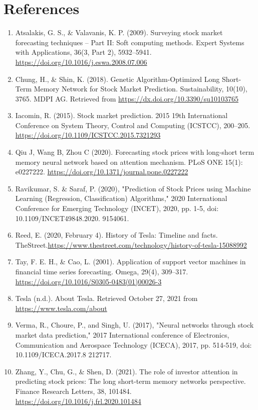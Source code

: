 \documentclass[12pt,a4paper]{article}
\begin{document}
\section*{References}
\begin{enumerate}
    \item Atsalakis, G. S., \& Valavanis, K. P. (2009). Surveying stock market forecasting techniques – Part II: Soft computing methods. Expert Systems with Applications, 36(3, Part 2), 5932–5941. \url{https://doi.org/10.1016/j.eswa.2008.07.006}
    \item Chung, H., \& Shin, K. (2018). Genetic Algorithm-Optimized Long Short-Term Memory Network for Stock Market Prediction. Sustainability, 10(10), 3765. MDPI AG. Retrieved from \url{https://dx.doi.org/10.3390/su10103765 }
    \item Iacomin, R. (2015). Stock market prediction. 2015 19th International Conference on System Theory, Control and Computing (ICSTCC), 200–205. \url{https://doi.org/10.1109/ICSTCC.2015.7321293}
    \item Qiu J, Wang B, Zhou C (2020). Forecasting stock prices with long-short term memory neural network based on attention mechanism. PLoS ONE 15(1): e0227222.  \url{https://doi.org/10.1371/journal.pone.0227222}
    \item Ravikumar, S. \& Saraf, P. (2020), "Prediction of Stock Prices using Machine Learning (Regression, Classification) Algorithms," 2020 International Conference for Emerging Technology (INCET), 2020, pp. 1-5, doi: 10.1109/INCET49848.2020.
    9154061.
    \item Reed, E. (2020, February 4). History of Tesla: Timeline and facts. TheStreet.\url{https://www.thestreet.com/technology/history-of-tesla-15088992}
    \item Tay, F. E. H., \& Cao, L. (2001). Application of support vector machines in financial time series forecasting. Omega, 29(4), 309–317.  \url{https://doi.org/10.1016/S0305-0483(01)00026-3}
    \item Tesla (n.d.). About Tesla. Retrieved October 27, 2021 from \url{https://www.tesla.com/about }
    \item Verma, R., Choure, P., and Singh, U. (2017), "Neural networks through stock market data prediction," 2017 International conference of Electronics, Communication and Aerospace Technology (ICECA), 2017, pp. 514-519, doi: 10.1109/ICECA.2017.8
    212717.
    \item Zhang, Y., Chu, G., \& Shen, D. (2021). The role of investor attention in predicting stock prices: The long short-term memory networks perspective. Finance Research Letters, 38, 101484.  \url{https://doi.org/10.1016/j.frl.2020.101484}
\end{enumerate}
\end{document}

